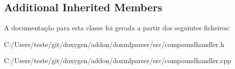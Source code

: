 \subsection*{Additional Inherited Members}


A documentação para esta classe foi gerada a partir dos seguintes ficheiros\-:\begin{DoxyCompactItemize}
\item 
C\-:/\-Users/teste/git/doxygen/addon/doxmlparser/src/compoundhandler.\-h\item 
C\-:/\-Users/teste/git/doxygen/addon/doxmlparser/src/compoundhandler.\-cpp\end{DoxyCompactItemize}
